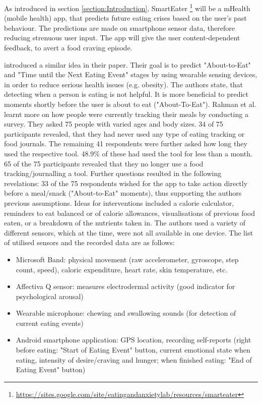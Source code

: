 
As introduced in section \ref{section:Introduction}, SmartEater \footnote{\url{https://sites.google.com/site/eatingandanxietylab/resources/smarteater}} will be a mHealth (mobile health) app, that predicts future eating crises based on the user's past behaviour. The predictions are made on smartphone sensor data, therefore reducing strenuous user input. The app will give the user content-dependent feedback, to avert a food craving episode. 

\textcite{AboutToEat2016Rahman} introduced a similar idea in their paper. Their goal is to predict "About-to-Eat" and "Time until the Next Eating Event" stages by using wearable sensing devices, in order to reduce serious health issues (e.g. obesity). The authors state, that detecting when a person is eating is not helpful. It is more beneficial to predict moments shortly before the user is about to eat ("About-To-Eat").
Rahman et al. learnt more on how people were currently tracking their meals by conducting a survey. They asked 75 people with varied ages and body sizes. 34 of 75 participants revealed, that they had never used any type of eating tracking or food journals. The remaining 41 respondents were further asked how long they used the respective tool. 48.9\% of these had used the tool for less than a month. 65 of the 75 participants revealed that they no longer use a food tracking/journalling a tool. Further questions resulted in the following revelations: 33 of the 75 respondents wished for the app to take action directly before a meal/snack ("About-to-Eat" moments), thus supporting the authors previous assumptions. Ideas for interventions included a calorie calculator, reminders to eat balanced or of calorie allowances, visualisations of previous food eaten, or a breakdown of the nutrients taken in.
The authors used a variety of different sensors, which at the time, were not all available in one device. The list of utilised sensors and the recorded data are as follows:
\begin{itemize}
  \item Microsoft Band: physical movement (raw accelerometer, gyroscope, step count, speed), caloric expenditure, heart rate, skin temperature, etc. 
  \item Affectiva Q sensor: measures electrodermal activity (good indicator for psychological arousal) 
  \item Wearable microphone: chewing and swallowing sounds (for detection of current eating events)
  \item Android smartphone application: GPS location, recording self-reports (right before eating: "Start of Eating Event" button, current emotional state when eating, intensity of desire/craving and hunger; when finished eating: "End of Eating Event" button)
\end{itemize}
